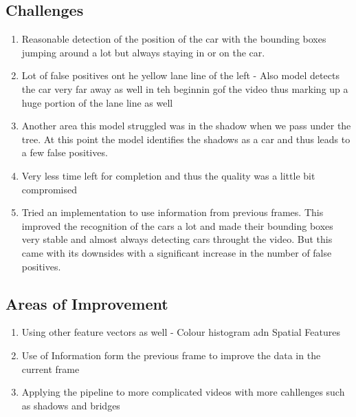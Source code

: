 \documentclass[11pt]{article}
\providecommand{\tightlist}{%
      \setlength{\itemsep}{0pt}\setlength{\parskip}{0pt}}
\begin{document}
    \hypertarget{challenges}{%
\subsection{Challenges}\label{challenges}}

\begin{enumerate}
\def\labelenumi{\arabic{enumi}.}
\tightlist
\item
  Reasonable detection of the position of the car with the bounding
  boxes jumping around a lot but always staying in or on the car.
\item
  Lot of false positives ont he yellow lane line of the left - Also
  model detects the car very far away as well in teh beginnin gof the
  video thus marking up a huge portion of the lane line as well
\item
  Another area this model struggled was in the shadow when we pass under
  the tree. At this point the model identifies the shadows as a car and
  thus leads to a few false positives.
\item
  Very less time left for completion and thus the quality was a little
  bit compromised
\item
  Tried an implementation to use information from previous frames. This
  improved the recognition of the cars a lot and made their bounding
  boxes very stable and almost always detecting cars throught the video.
  But this came with its downsides with a significant increase in the
  number of false positives.
\end{enumerate}

\hypertarget{areas-of-improvement}{%
\subsection{Areas of Improvement}\label{areas-of-improvement}}

\begin{enumerate}
\def\labelenumi{\arabic{enumi}.}
\tightlist
\item
  Using other feature vectors as well - Colour histogram adn Spatial
  Features
\item
  Use of Information form the previous frame to improve the data in the
  current frame
\item
  Applying the pipeline to more complicated videos with more cahllenges
  such as shadows and bridges
\end{enumerate}


    
    
    
    
\end{document}
